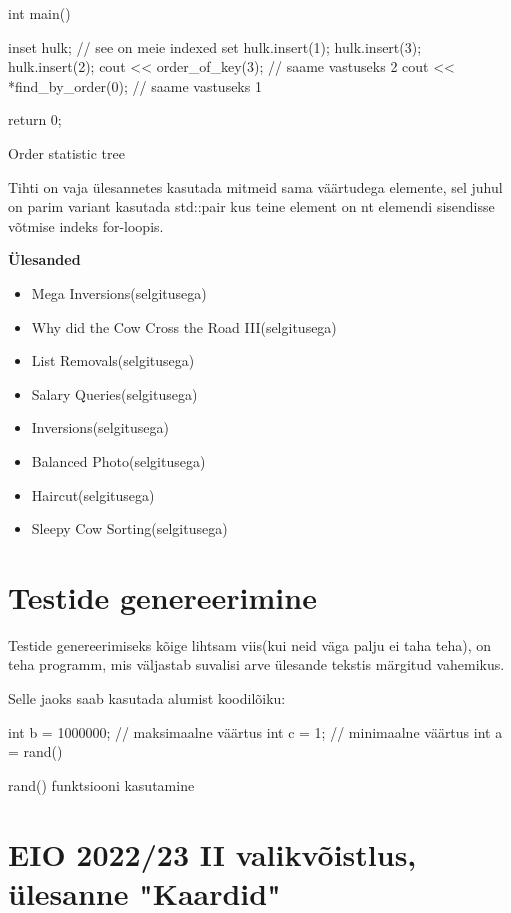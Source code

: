 \documentclass{trkut}
\begin{document}
\begin{appendices}
\begin{cclol}
    int main(){
    inset hulk; // see on meie indexed set
    hulk.insert(1); hulk.insert(3); hulk.insert(2);
    cout << order_of_key(3); // saame vastuseks 2
    cout << *find_by_order(0); // saame vastuseks 1
    
    return 0;
    }
    \end{cclol}
    \begin{kk}[H]
    \caption{Order statistic tree}%
    \end{kk}


    Tihti on vaja ülesannetes kasutada mitmeid sama väärtudega elemente, sel juhul on parim variant kasutada std::pair kus teine element on nt elemendi sisendisse võtmise indeks for-loopis.

\textbf{Ülesanded}
\begin{itemize}
\item Mega Inversions(selgitusega)
\item Why did the Cow Cross the Road III(selgitusega)
\item List Removals(selgitusega)
\item Salary Queries(selgitusega)
\item Inversions(selgitusega)
\item Balanced Photo(selgitusega)
\item Haircut(selgitusega)
\item Sleepy Cow Sorting(selgitusega)
\end{itemize}
 \chapter{Testide genereerimine}\label{lisa14}
    \tiny
    \normalsize

    Testide genereerimiseks kõige lihtsam viis(kui neid väga palju ei taha teha), on teha programm, mis väljastab suvalisi arve ülesande tekstis märgitud vahemikus.

    Selle jaoks saab kasutada alumist koodilõiku:
    \begin{cclol}
    int b = 1000000; // maksimaalne väärtus
    int c = 1;      // minimaalne väärtus
    int a = rand() %
    \end{cclol}
    \begin{kk}[H]
    \caption{rand() funktsiooni kasutamine}%
    \end{kk}

\chapter{EIO 2022/23 II valikvõistlus, ülesanne "Kaardid"}\label{lisa15}
    \tiny
    \normalsize

\end{appendices}
\end{document}
